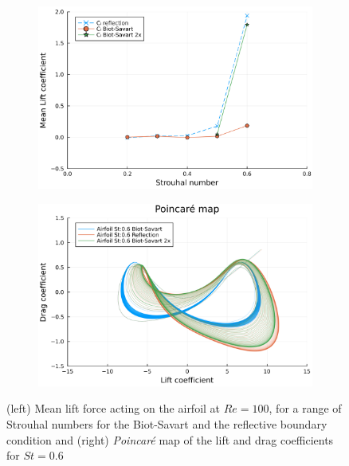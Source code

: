 \documentclass[preprint,12pt]{elsarticle}
\begin{document}
\begin{figure}
    \centering
    \begin{subfigure}{.5\textwidth}
        \centering
        \includegraphics[trim={0 0 0 0},clip,width=\textwidth]{tex/fig/CL_mean_deflected_wake.png}
    \end{subfigure}%
    \begin{subfigure}{.5\textwidth}
        \centering
        \includegraphics[trim={0 0 0 0},clip,width=\textwidth]{tex/fig/poincare_deflected_wake.png}
    \end{subfigure}
    \caption{(left) Mean lift force acting on the airfoil at $Re=100$, for a range of Strouhal numbers for the Biot-Savart and the reflective boundary condition  and (right) \emph{Poincar\'e} map of the lift and drag coefficients for $St=0.6$}
    \label{fig:deflected_wake_2}
\end{figure}
\end{document}
